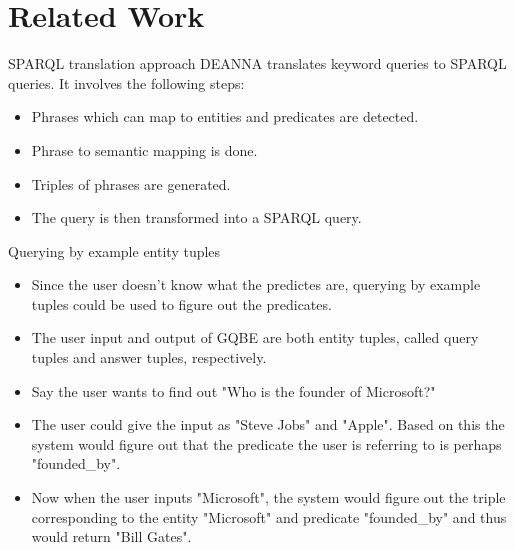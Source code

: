 \documentclass[pdf,11pt]{beamer}
\begin{document}
\section{Related Work}

\begin{frame}
\end{frame}


\begin{frame}{SPARQL translation approach}
DEANNA translates keyword queries to SPARQL queries. It involves the following steps:
\begin{itemize}
\item Phrases which can map to entities and predicates are detected.

\item Phrase to semantic mapping is done.

\item Triples of phrases are generated.

\item The query is then transformed into a SPARQL query.
\end{itemize}
\end{frame}

\begin{frame}{Querying by example entity tuples}
\begin{itemize}
\item
Since the user doesn't know what the predictes are, querying by example tuples could be used to figure out the predicates.

\item The user input and output of GQBE are both entity tuples,
called query tuples and answer tuples, respectively.

\item Say the user wants to find out "Who is the founder of Microsoft?"

\item The user could give the input as "Steve Jobs" and "Apple". Based on this the system would figure out that the predicate the user is referring to is perhaps "founded\_by".

\item Now when the user inputs "Microsoft", the system would figure out the triple corresponding to the entity "Microsoft" and predicate "founded\_by" and thus would return "Bill Gates".

\end{itemize}
\end{frame}
\end{document}
